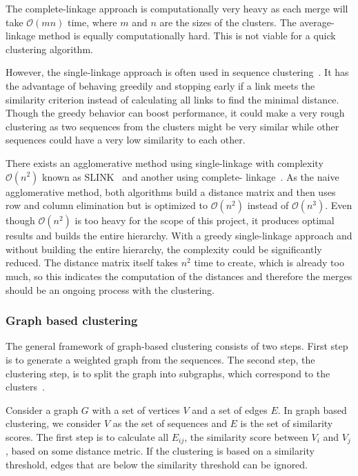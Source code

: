 The complete-linkage approach is computationally very heavy as each merge will
take $\mathcal{O}(mn)$ time, where $m$ and $n$ are the sizes of the clusters.
The average-linkage method is equally computationally hard. This is not viable
for a quick clustering algorithm.

However, the single-linkage approach is often used in sequence
clustering~\cite[pp. 62-63]{dong}. It has the advantage of behaving greedily
and stopping early if a link meets the similarity criterion instead of
calculating all links to find the minimal distance. Though the greedy behavior
can boost performance, it could make a very rough clustering as two sequences
from the clusters might be very similar while other sequences could have a very
low similarity to each other.

There exists an agglomerative method using single-linkage with complexity
$\mathcal{O}(n^2)$ known as SLINK~\cite{sibson} and another using complete-
linkage~\cite{defays}. As the naive agglomerative method, both algorithms build
a distance matrix and then uses row and column elimination but is optimized to
$\mathcal{O}(n^2)$ instead of $\mathcal{O}(n^3)$. Even though $\mathcal{O}(n^2)$
is too heavy for the scope of this project, it produces optimal results and
builds the entire hierarchy. With a greedy single-linkage approach and without
building the entire hierarchy, the complexity could be significantly reduced.
The distance matrix itself takes $n^2$ time to create, which is already too
much, so this indicates the computation of the distances and therefore the
merges should be an ongoing process with the clustering.


\subsubsection{Graph based clustering}

The general framework of graph-based clustering consists of two steps. First
step is to generate a weighted graph from the sequences. The second step, the
clustering step, is to split the graph into subgraphs, which correspond to the
clusters~\cite[pp. 64-65]{dong}.

Consider a graph $G$ with a set of vertices $V$ and a set of edges $E$. In
graph based clustering, we consider $V$ as the set of sequences and $E$ is the
set of similarity scores. The first step is to calculate all $E_{ij}$, the
similarity score between $V_i$ and $V_j$, based on some distance metric. If the
clustering is based on a similarity threshold, edges that are below the
similarity threshold can be ignored.

